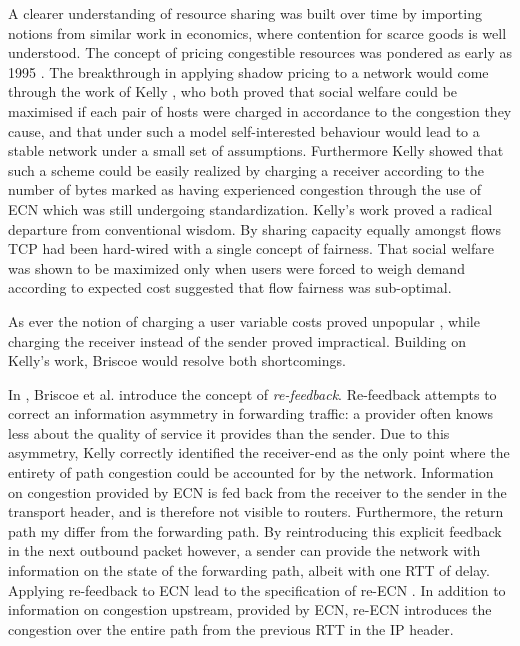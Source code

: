 A clearer understanding of resource sharing was built over time by importing notions from similar work in economics, where contention for scarce goods is well understood. 
The concept of pricing congestible resources was pondered as early as 1995 \cite{MacKieMason:1995p493}. 
The breakthrough in applying shadow pricing to a network would come through the work of Kelly \cite{Kelly:1998p139}, who both proved that social welfare could be maximised if each pair of hosts were charged in accordance to the congestion they cause, and that under such a model self-interested behaviour would lead to a stable network under a small set of assumptions.
Furthermore Kelly showed that such a scheme could be easily realized by charging a receiver according to the number of bytes marked as having experienced congestion through the use of \ac{ECN} which was still undergoing standardization.
Kelly's work proved a radical departure from conventional wisdom. 
By sharing capacity equally amongst flows \ac{TCP} had been hard-wired with a single concept of fairness.
That social welfare was shown to be maximized only when users were forced to weigh demand according to expected cost suggested that flow fairness was sub-optimal.

As ever the notion of charging a user variable costs proved unpopular \cite{Odlyzko:2004p290}, while charging the receiver instead of the sender proved impractical.
Building on Kelly's work, Briscoe would resolve both shortcomings.

In \cite{Briscoe:2005p346}, Briscoe et al. introduce the concept of \emph{re-feedback}.
Re-feedback attempts to correct an information asymmetry in forwarding traffic: a provider often knows less about the quality of service it provides than the sender.
Due to this asymmetry, Kelly correctly identified the receiver-end as the only point where the entirety of path congestion could be accounted for by the network.
Information on congestion provided by \ac{ECN} is fed back from the receiver to the sender in the transport header, and is therefore not visible to routers.
Furthermore, the return path my differ from the forwarding path.
By reintroducing this explicit feedback in the next outbound packet however, a sender can provide the network with information on the state of the forwarding path, albeit with one \ac{RTT} of delay.
Applying re-feedback to \ac{ECN} lead to the specification of re-\ac{ECN} \cite{Briscoe:2008p494}. 
In addition to information on congestion upstream, provided by \ac{ECN}, re-\ac{ECN} introduces the congestion over the entire path from the previous \ac{RTT} in the \ac{IP} header.

